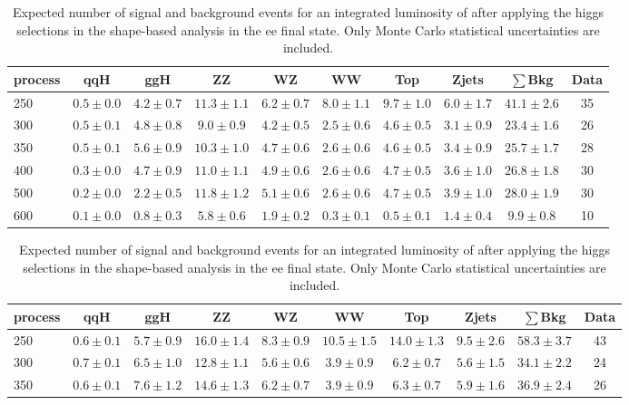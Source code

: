 \begin{table}
{\footnotesize
 \begin{center}
 \begin{tabular}{l | c c | c c c c c c | c}
 \hline
 process & qqH & ggH & ZZ & WZ & WW & Top & Zjets & $\sum$Bkg  & Data\\
 \hline
250 & $0.5\pm0.0$ & $4.2\pm0.7$ & $11.3\pm1.1$ & $6.2\pm0.7$ & $8.0\pm1.1$ & $9.7\pm1.0$ & $6.0\pm1.7$ & $41.1\pm2.6$ & 35 \\
300 & $0.5\pm0.1$ & $4.8\pm0.8$ & $9.0\pm0.9$ & $4.2\pm0.5$ & $2.5\pm0.6$ & $4.6\pm0.5$ & $3.1\pm0.9$ & $23.4\pm1.6$ & 26 \\
350 & $0.5\pm0.1$ & $5.6\pm0.9$ & $10.3\pm1.0$ & $4.7\pm0.6$ & $2.6\pm0.6$ & $4.6\pm0.5$ & $3.4\pm0.9$ & $25.7\pm1.7$ & 28 \\
400 & $0.3\pm0.0$ & $4.7\pm0.9$ & $11.0\pm1.1$ & $4.9\pm0.6$ & $2.6\pm0.6$ & $4.7\pm0.5$ & $3.6\pm1.0$ & $26.8\pm1.8$ & 30 \\
500 & $0.2\pm0.0$ & $2.2\pm0.5$ & $11.8\pm1.2$ & $5.1\pm0.6$ & $2.6\pm0.6$ & $4.7\pm0.5$ & $3.9\pm1.0$ & $28.0\pm1.9$ & 30 \\
600 & $0.1\pm0.0$ & $0.8\pm0.3$ & $5.8\pm0.6$ & $1.9\pm0.2$ & $0.3\pm0.1$ & $0.5\pm0.1$ & $1.4\pm0.4$ & $9.9\pm0.8$ & 10 \\
\hline
\end{tabular}
\end{center}
}
\caption{Expected number of signal and background events for an 
  integrated luminosity of \intlumi after applying the higgs selections in the shape-based analysis in the ee final state. 
  Only Monte Carlo statistical uncertainties are included. }
\label{tab:yield_shapebased_ee}
{\footnotesize
 \begin{center}
 \begin{tabular}{l | c c |  c c c c c c | c }
 \hline
 process & qqH & ggH & ZZ & WZ & WW & Top & Zjets  & $\sum$Bkg & Data \\
 \hline
250 & $0.6\pm0.1$ & $5.7\pm0.9$ & $16.0\pm1.4$ & $8.3\pm0.9$ & $10.5\pm1.5$ & $14.0\pm1.3$ & $9.5\pm2.6$ & $58.3\pm3.7$ & 43 \\
300 & $0.7\pm0.1$ & $6.5\pm1.0$ & $12.8\pm1.1$ & $5.6\pm0.6$ & $3.9\pm0.9$ & $6.2\pm0.7$ & $5.6\pm1.5$ & $34.1\pm2.2$ & 24 \\
350 & $0.6\pm0.1$ & $7.6\pm1.2$ & $14.6\pm1.3$ & $6.2\pm0.7$ & $3.9\pm0.9$ & $6.3\pm0.7$ & $5.9\pm1.6$ & $36.9\pm2.4$ & 26 \\

\end{tabular}
\end{center}}
\end{table}
